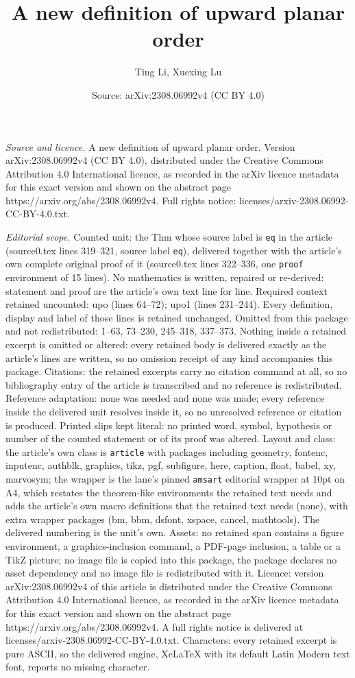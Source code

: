 \documentclass[10pt,a4paper]{amsart}
\title[A new definition of upward planar order]{A new definition of upward planar order}
\author{Ting Li, Xuexing Lu}
\date{Source: arXiv:2308.06992v4 (CC BY 4.0)}
\begin{document}
\maketitle

\noindent\emph{Source and licence.} A new definition of upward planar order. Version arXiv:2308.06992v4 (CC BY 4.0), distributed under the Creative Commons Attribution 4.0 International licence, as recorded in the arXiv licence metadata for this exact version and shown on the abstract page https://arxiv.org/abs/2308.06992v4. Full rights notice: licenses/arxiv-2308.06992-CC-BY-4.0.txt.\par\smallskip

\noindent\textit{Editorial scope.} Counted unit: the Thm whose source label is \texttt{eq} in the article (source0.tex lines 319--321, source label \texttt{eq}), delivered together with the article's own complete original proof of it (source0.tex lines 322--336, one \texttt{proof} environment of 15 lines). No mathematics is written, repaired or re-derived: statement and proof are the article's own text line for line. Required context retained uncounted: upo (lines 64--72); upo1 (lines 231--244). Every definition, display and label of those lines is retained unchanged. Omitted from this package and not redistributed: 1--63, 73--230, 245--318, 337--373. Nothing inside a retained excerpt is omitted or altered: every retained body is delivered exactly as the article's lines are written, so no omission receipt of any kind accompanies this package. Citations: the retained excerpts carry no citation command at all, so no bibliography entry of the article is transcribed and no reference is redistributed. Reference adaptation: none was needed and none was made; every reference inside the delivered unit resolves inside it, so no unresolved reference or citation is produced. Printed slips kept literal: no printed word, symbol, hypothesis or number of the counted statement or of its proof was altered. Layout and class: the article's own class is \texttt{article} with packages including geometry, fontenc, inputenc, authblk, graphics, tikz, pgf, subfigure, here, caption, float, babel, xy, marvosym; the wrapper is the lane's pinned \texttt{amsart} editorial wrapper at 10pt on A4, which restates the theorem-like environments the retained text needs and adds the article's own macro definitions that the retained text needs (none), with extra wrapper packages (bm, bbm, dsfont, xspace, cancel, mathtools). The delivered numbering is the unit's own. Assets: no retained span contains a figure environment, a graphics-inclusion command, a PDF-page inclusion, a table or a TikZ picture; no image file is copied into this package, the package declares no asset dependency and no image file is redistributed with it. Licence: version arXiv:2308.06992v4 of this article is distributed under the Creative Commons Attribution 4.0 International licence, as recorded in the arXiv licence metadata for this exact version and shown on the abstract page https://arxiv.org/abs/2308.06992v4. A full rights notice is delivered at licenses/arxiv-2308.06992-CC-BY-4.0.txt. Characters: every retained excerpt is pure ASCII, so the delivered engine, XeLaTeX with its default Latin Modern text font, reports no missing character.
\end{document}
